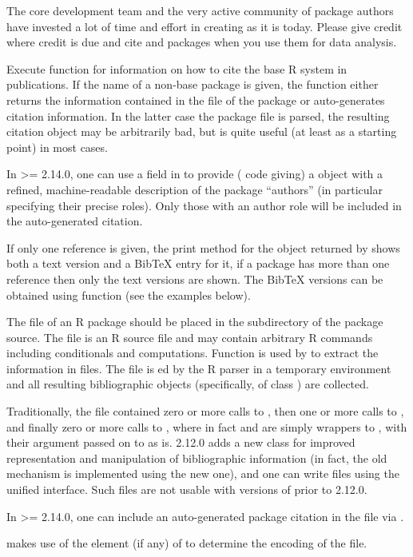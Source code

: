\begin{Details}\relax
The \R{} core development team and the very active community of package
authors have invested a lot of time and effort in creating \R{} as it is
today.  Please give credit where credit is due and cite \R{} and \R{}
packages when you use them for data analysis.

Execute function  for information on how to cite the
base R system in publications.  If the name of a non-base package is
given, the function either returns the information contained in the
 file of the package or auto-generates citation
information.  In the latter case the package  file
is parsed, the resulting citation object may be arbitrarily bad, but
is quite useful (at least as a starting point) in most cases.

In \R{} >= 2.14.0, one can use a  field in
 to provide (\R{} code giving) a
 object with a refined, machine-readable
description of the package ``authors'' (in particular specifying
their precise roles).  Only those with an author role will be
included in the auto-generated citation.

If only one reference is given, the print method for the object
returned by  shows both a text version and a BibTeX
entry for it, if a package has more than one reference then only the
text versions are shown.  The BibTeX versions can be obtained using
function  (see the examples below).

The  file of an R package should be placed in the
 subdirectory of the package source.  The file is an R
source file and may contain arbitrary R commands including
conditionals and computations.  Function  is
used by  to extract the information in
 files.  The file is ed by the R 
parser in a temporary environment and all resulting bibliographic
objects (specifically, of class ) are
collected.

Traditionally, the  file contained zero or more calls
to , then one or more calls to ,
and finally zero or more calls to , where in fact
 and  are simply wrappers to
, with their  argument passed on to
 as is.  \R{} 2.12.0 adds a new
 class for improved representation and
manipulation of bibliographic information (in fact, the old mechanism
is implemented using the new one), and one can write 
files using the unified  interface.  Such files
are not usable with versions of \R{} prior to 2.12.0.

In \R{} >= 2.14.0, one can include an auto-generated package citation in
the  file via .

 makes use of the  element (if
any) of  to determine the encoding of the file.
\end{Details}
